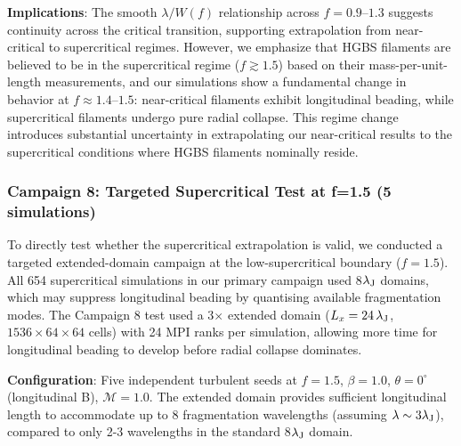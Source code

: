 \documentclass[twoside,twocolumn]{mnras}
\begin{document}
\textbf{Implications}: The smooth $\lambda/W(f)$ relationship across $f = 0.9$--$1.3$ suggests continuity across the critical transition, supporting extrapolation from near-critical to supercritical regimes. However, we emphasize that HGBS filaments are believed to be in the supercritical regime ($f \gtrsim 1.5$) based on their mass-per-unit-length measurements, and our simulations show a fundamental change in behavior at $f \approx 1.4$--$1.5$: near-critical filaments exhibit longitudinal beading, while supercritical filaments undergo pure radial collapse. This regime change introduces substantial uncertainty in extrapolating our near-critical results to the supercritical conditions where HGBS filaments nominally reside.

\subsubsection{Campaign 8: Targeted Supercritical Test at f=1.5 (5 simulations)}

To directly test whether the supercritical extrapolation is valid, we conducted a targeted extended-domain campaign at the low-supercritical boundary ($f = 1.5$). All 654 supercritical simulations in our primary campaign used 8$\lambda_{\rm J}$ domains, which may suppress longitudinal beading by quantising available fragmentation modes. The Campaign 8 test used a 3$\times$ extended domain ($L_x = 24\,\lambda_{\rm J}$, $1536 \times 64 \times 64$ cells) with 24 MPI ranks per simulation, allowing more time for longitudinal beading to develop before radial collapse dominates.

\textbf{Configuration}: Five independent turbulent seeds at $f = 1.5$, $\beta = 1.0$, $\theta = 0^\circ$ (longitudinal B), $\mathcal{M} = 1.0$. The extended domain provides sufficient longitudinal length to accommodate up to 8 fragmentation wavelengths (assuming $\lambda \sim 3\lambda_{\rm J}$), compared to only 2-3 wavelengths in the standard 8$\lambda_{\rm J}$ domain.
\end{document}
